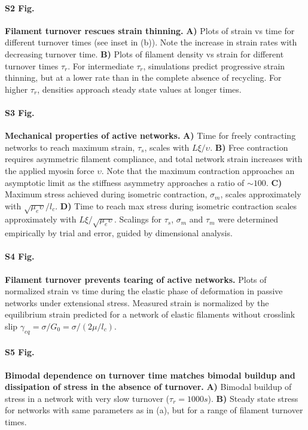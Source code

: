 \paragraph*{S2 Fig.}
\label{fig:thinning}
{\bf  Filament turnover rescues strain thinning.} \textbf{A)} Plots of strain vs time for different turnover times (see inset in (b)). Note the increase in strain rates with decreasing turnover time. \textbf{B)} Plots of filament density vs strain for different turnover times $\tau_r$.  For intermediate $\tau_r$, simulations predict progressive strain thinning, but at a lower rate than in the complete absence of recycling. For higher $\tau_r$, densities approach steady state values at longer times.  

\paragraph*{S3 Fig.}
\label{fig:active_supp}
{\bf  Mechanical properties of active networks.}  \textbf{A)}  Time for freely contracting networks to reach maximum strain, $\tau_s$, scales with $L\xi/\upsilon$.  \textbf{B)} Free contraction requires asymmetric filament compliance, and total network strain increases with the applied myosin force $\upsilon$. Note that the maximum contraction approaches an asymptotic limit as the stiffness asymmetry approaches a ratio of $\sim 100$.   \textbf{C)}  Maximum stress achieved during isometric contraction, $\sigma_m$, scales approximately with $\sqrt{\mu_e\upsilon}/l_c$.  \textbf{D)} Time to reach max stress during isometric contraction scales approximately with $L\xi/\sqrt{\mu_e\upsilon}$. Scalings for $\tau_s$, $\sigma_m$ and $\tau_m$ were determined empirically by trial and error, guided by dimensional analysis.  

\paragraph*{S4 Fig.}
\label{fig:active_tear}
{\bf  Filament turnover prevents tearing of active networks.}  Plots of normalized strain vs time during the elastic phase of deformation in passive networks under extensional stress.  Measured strain is normalized by the equilibrium strain predicted for a network of elastic filaments without crosslink slip $\gamma_{eq} = \sigma/G_0 = \sigma/(2\mu/l_c)$.  


\paragraph*{S5 Fig.}
\label{fig:recycle_supp}
{\bf Bimodal dependence on turnover time matches bimodal buildup and dissipation of stress in the absence of turnover.}   \textbf{A)}  Bimodal buildup of stress in a network with very slow turnover ($\tau_r = 1000s$).  \textbf{B)}  Steady state stress for networks with same parameters as in (a), but  for a range of filament turnover times.   

